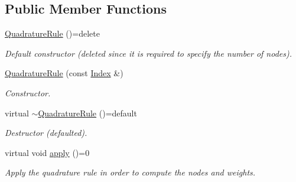 \subsection*{Public Member Functions}
\begin{DoxyCompactItemize}
\item 
\hypertarget{classQuadratureRule_ac7fb9aaf8e3f9eae03235f68a935880a}{\hyperlink{classQuadratureRule_ac7fb9aaf8e3f9eae03235f68a935880a}{Quadrature\-Rule} ()=delete}\label{classQuadratureRule_ac7fb9aaf8e3f9eae03235f68a935880a}

\begin{DoxyCompactList}\small\item\em Default constructor (deleted since it is required to specify the number of nodes). \end{DoxyCompactList}\item 
\hyperlink{classQuadratureRule_a1d658803a64ae7aa2d9a59754483f8a0}{Quadrature\-Rule} (const \hyperlink{typedefs_8h_a2c726f8f32697958e9d6c2afecda531d}{Index} \&)
\begin{DoxyCompactList}\small\item\em Constructor. \end{DoxyCompactList}\item 
\hypertarget{classQuadratureRule_a80e11fbb08b332f2d4c56740cb63ac4e}{virtual \hyperlink{classQuadratureRule_a80e11fbb08b332f2d4c56740cb63ac4e}{$\sim$\-Quadrature\-Rule} ()=default}\label{classQuadratureRule_a80e11fbb08b332f2d4c56740cb63ac4e}

\begin{DoxyCompactList}\small\item\em Destructor (defaulted). \end{DoxyCompactList}\item 
\hypertarget{classQuadratureRule_ae8035f1283a63c55fbbfb4e786db8a98}{virtual void \hyperlink{classQuadratureRule_ae8035f1283a63c55fbbfb4e786db8a98}{apply} ()=0}\label{classQuadratureRule_ae8035f1283a63c55fbbfb4e786db8a98}

\begin{DoxyCompactList}\small\item\em Apply the quadrature rule in order to compute the nodes and weights. \end{DoxyCompactList}\end{DoxyCompactItemize}
